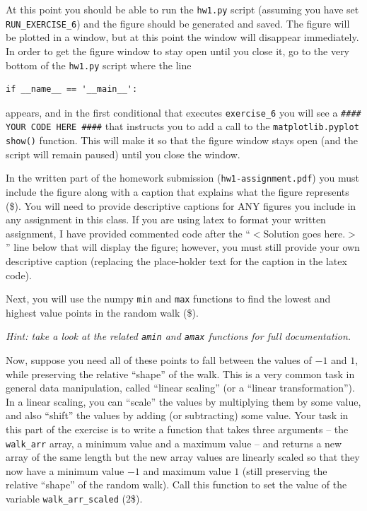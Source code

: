 \documentclass[10pt]{article}
\begin{document}
\begin{enumerate}
At this point you should be able to run the {\tt hw1.py} script (assuming you have set {\tt RUN\_EXERCISE\_6}) and the figure should be generated and saved. The figure will be plotted in a window, but at this point the window will disappear immediately. In order to get the figure window to stay open until you close it, go to the very bottom of the {\tt hw1.py} script where the line
\begin{verbatim}
if __name__ == '__main__':
\end{verbatim}
appears, and in the first conditional that executes {\tt exercise\_6} you will see a {\tt \#\#\#\# YOUR CODE HERE \#\#\#\#} that instructs you to add a call to the {\tt matplotlib.pyplot} {\tt show()} function. This will make it so that the figure window stays open (and the script will remain paused) until you close the window.

In the written part of the homework submission ({\tt hw1-assignment.pdf}) you must include the figure along with a caption that explains what the figure represents (\$). You will need to provide descriptive captions for ANY figures you include in any assignment in this class. If you are using latex to format your written assignment, I have provided commented code after the ``$<$Solution goes here.$>$'' line below that will display the figure; however, you must still provide your own descriptive caption (replacing the place-holder text for the caption in the latex code).

Next, you will use the numpy {\tt min} and {\tt max} functions to find the lowest and highest value points in the random walk (\$).

{\em Hint: take a look at the related {\tt amin} and {\tt amax} functions for full documentation.}

Now, suppose you need all of these points to fall between the values of $-1$ and $1$, while preserving the relative ``shape'' of the walk. This is a very common task in general data manipulation, called ``linear scaling'' (or a ``linear transformation''). In a linear scaling, you can ``scale'' the values by multiplying them by some value, and also ``shift'' the values by adding (or subtracting) some value. Your task in this part of the exercise is to write a function that takes three arguments -- the {\tt walk\_arr} array, a minimum value and a maximum value -- and returns a new array of the same length but the new array values are linearly scaled so that they now have a minimum value $-1$ and maximum value $1$ (still preserving the relative ``shape'' of the random walk). Call this function to set the value of the variable {\tt walk\_arr\_scaled} (2\$).


\end{enumerate}
\end{document}
